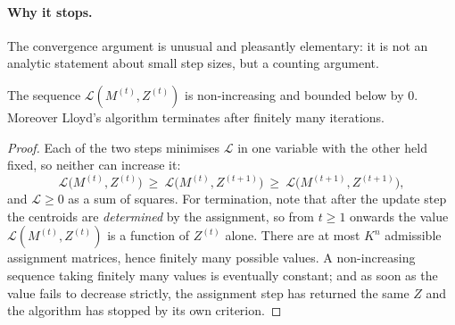 \begin{center}
\end{center}

\paragraph{Why it stops.}
The convergence argument is unusual and pleasantly elementary: it is not an analytic
statement about small step sizes, but a counting argument.

\begin{prop}
\label{prop:lloyd-converges}
The sequence $\mathcal{L}(M^{(t)}, Z^{(t)})$ is non-increasing and bounded below by $0$.
Moreover Lloyd's algorithm terminates after finitely many iterations.
\end{prop}

\begin{proof}
Each of the two steps minimises $\mathcal{L}$ in one variable with the other held fixed,
so neither can increase it:
\[
\mathcal{L}\big(M^{(t)}, Z^{(t)}\big) \ \geq \ \mathcal{L}\big(M^{(t)}, Z^{(t+1)}\big)
\ \geq \ \mathcal{L}\big(M^{(t+1)}, Z^{(t+1)}\big) ,
\]
and $\mathcal{L} \geq 0$ as a sum of squares. For termination, note that after the
update step the centroids are \emph{determined} by the assignment, so from $t \geq 1$
onwards the value $\mathcal{L}(M^{(t)}, Z^{(t)})$ is a function of $Z^{(t)}$ alone. There are at most
$K^n$ admissible assignment matrices, hence finitely many possible values. A
non-increasing sequence taking finitely many values is eventually constant; and as soon
as the value fails to decrease strictly, the assignment step has returned the same $Z$
and the algorithm has stopped by its own criterion.
\end{proof}

